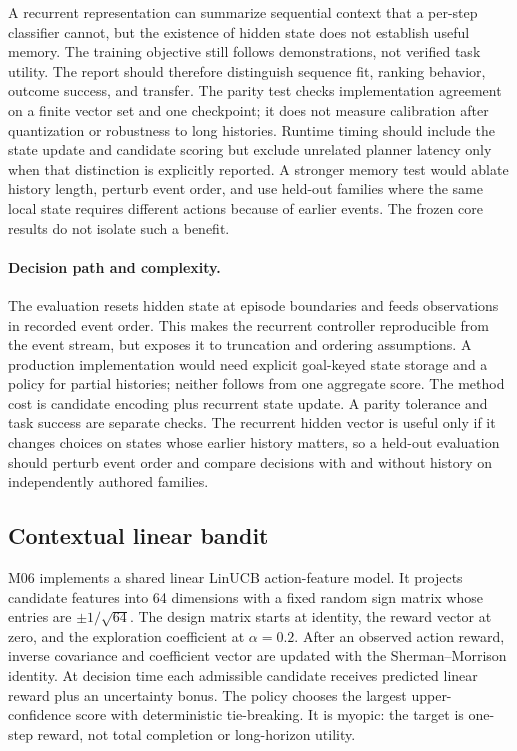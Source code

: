 A recurrent representation can summarize sequential context that a per-step classifier cannot, but the existence of hidden state does not establish useful memory. The training objective still follows demonstrations, not verified task utility. The report should therefore distinguish sequence fit, ranking behavior, outcome success, and transfer. The parity test checks implementation agreement on a finite vector set and one checkpoint; it does not measure calibration after quantization or robustness to long histories. Runtime timing should include the state update and candidate scoring but exclude unrelated planner latency only when that distinction is explicitly reported. A stronger memory test would ablate history length, perturb event order, and use held-out families where the same local state requires different actions because of earlier events. The frozen core results do not isolate such a benefit.


\paragraph{Decision path and complexity.} The evaluation resets hidden state at episode boundaries and feeds observations in recorded event order. This makes the recurrent controller reproducible from the event stream, but exposes it to truncation and ordering assumptions. A production implementation would need explicit goal-keyed state storage and a policy for partial histories; neither follows from one aggregate score. The method cost is candidate encoding plus recurrent state update. A parity tolerance and task success are separate checks. The recurrent hidden vector is useful only if it changes choices on states whose earlier history matters, so a held-out evaluation should perturb event order and compare decisions with and without history on independently authored families.

\subsection{Contextual linear bandit}\label{sec:method-m06}
M06 implements a shared linear LinUCB action-feature model. It projects candidate features into 64 dimensions with a fixed random sign matrix whose entries are $\pm1/\sqrt{64}$. The design matrix starts at identity, the reward vector at zero, and the exploration coefficient at $\alpha=0.2$. After an observed action reward, inverse covariance and coefficient vector are updated with the Sherman--Morrison identity. At decision time each admissible candidate receives predicted linear reward plus an uncertainty bonus. The policy chooses the largest upper-confidence score with deterministic tie-breaking. It is myopic: the target is one-step reward, not total completion or long-horizon utility.

